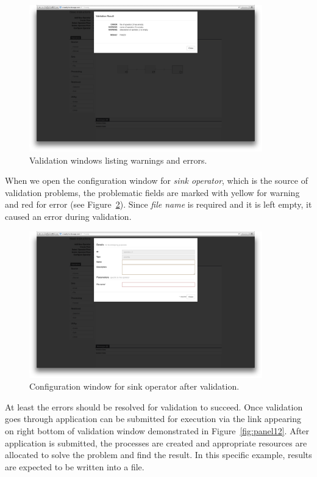 \begin{figure}[ht]
	\centering
	\includegraphics[width=0.9\textwidth]{figures/tool/panel10.png}
	\caption{Validation windows listing warnings and errors.}
	\label{fig:panel10}
\end{figure}

When we open the configuration window for \textit{sink operator}, which is the source 
of validation problems, the problematic fields are marked with yellow for warning and 
red for error (see Figure~\ref{fig:panel11}). Since \textit{file name} is required and it is 
left empty, it caused an error during validation.

\begin{figure}[ht]
	\centering
	\includegraphics[width=0.9\textwidth]{figures/tool/panel11.png}
	\caption{Configuration window for sink operator after validation.}
	\label{fig:panel11}
\end{figure}

At least the errors should be resolved for validation to succeed. Once validation goes 
through application can be submitted for execution via the link appearing on right bottom 
of validation window demonstrated in Figure~\ref{fig:panel12}. After application is 
submitted, the processes are created and appropriate resources are allocated to solve 
the problem and find the result. In this specific example, results are expected to be 
written into a file.

